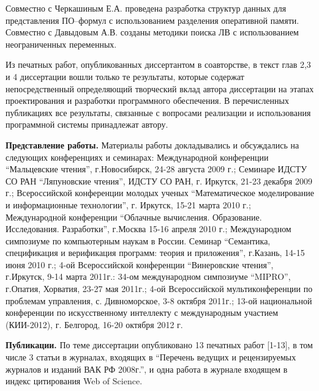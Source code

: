\documentclass[a4paper]{report}
\begin{document}
Совместно с Черкашиным Е.А. проведена разработка структур данных для представления ПО--формул с использованием разделения оперативной памяти. Совместно с Давыдовым А.В. созданы методики поиска ЛВ с использованием неограниченных переменных.

Из печатных работ, опубликованных диссертантом в соавторстве, в текст глав 2,3 и 4 диссертации вошли только те результаты, которые содержат непосредственный определяющий творческий вклад автора диссертации на этапах проектирования и разработки программного обеспечения. В перечисленных публикациях все результаты, связанные с вопросами реализации и использования программной системы принадлежат автору.



\textbf{Представление работы.}
Материалы работы докладывались и обсуждались на следующих конференциях и семинарах:
Международной конференции ``Мальцевские чтения'', г.Новосибирск, 24-28 августа 2009 г.;
Семинаре ИДСТУ СО РАН ``Ляпуновские чтения'', ИДСТУ СО РАН, г. Иркутск, 21-23 декабря 2009 г.;
Всероссийской конференции молодых ученых ``Математическое моделирование и информационные технологии'', г. Иркутск, 15-21 марта 2010 г.;
Международной конференции ``Облачные вычисления. Образование. Исследования. Разработки'', г.Москва 15-16 апреля 2010 г.;
Международном симпозиуме по компьютерным наукам в России. Семинар ``Семантика, спецификация и верификация программ: теория и приложения'', г.Казань, 14-15 июня 2010 г.;
4-ой Всероссийской конференции ``Винеровские чтения'', г.Иркутск, 9-14 марта 2011г.:
34-ом международном симпозиуме ``MIPRO'', г.Опатия, Хорватия, 23-27 мая 2011г.;
4-ой Всероссийской мультиконференции по проблемам управления, с. Дивноморское, 3-8 октября 2011г.;
13-ой национальной конференции по искусственному интеллекту с международным участием (КИИ-2012), г. Белгород, 16-20 октября 2012 г.

\textbf{Публикации.} По теме диссертации опубликовано 13 печатных работ [1-13], в том числе 3 статьи в журналах, входящих в ``Перечень ведущих и рецензируемых журналов и изданий ВАК РФ 2008г.'', и одна работа в журнале входящем в индекс цитирования Web of Science.





\end{document}
